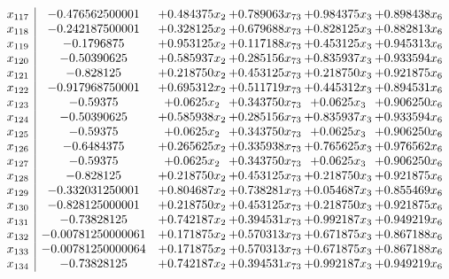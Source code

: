 \documentclass[11pt]{article}
\begin{document}
\[\begin{array}{c| c c@{\hskip 2pt} c@{\hskip 2pt} c@{\hskip 2pt} c@{\hskip 2pt} }
 x_{117}   &  -0.476562500001 & + 0.484375 x_{2} & + 0.789063 x_{73} & + 0.984375 x_{3} & + 0.898438 x_{6}\\
 x_{118}   &  -0.242187500001 & + 0.328125 x_{2} & + 0.679688 x_{73} & + 0.828125 x_{3} & + 0.882813 x_{6}\\
 x_{119}   &  -0.1796875 & + 0.953125 x_{2} & + 0.117188 x_{73} & + 0.453125 x_{3} & + 0.945313 x_{6}\\
 x_{120}   &  -0.50390625 & + 0.585937 x_{2} & + 0.285156 x_{73} & + 0.835937 x_{3} & + 0.933594 x_{6}\\
 x_{121}   &  -0.828125 & + 0.218750 x_{2} & + 0.453125 x_{73} & + 0.218750 x_{3} & + 0.921875 x_{6}\\
 x_{122}   &  -0.917968750001 & + 0.695312 x_{2} & + 0.511719 x_{73} & + 0.445312 x_{3} & + 0.894531 x_{6}\\
 x_{123}   &  -0.59375 & + 0.0625 x_{2} & + 0.343750 x_{73} & + 0.0625 x_{3} & + 0.906250 x_{6}\\
 x_{124}   &  -0.50390625 & + 0.585938 x_{2} & + 0.285156 x_{73} & + 0.835937 x_{3} & + 0.933594 x_{6}\\
 x_{125}   &  -0.59375 & + 0.0625 x_{2} & + 0.343750 x_{73} & + 0.0625 x_{3} & + 0.906250 x_{6}\\
 x_{126}   &  -0.6484375 & + 0.265625 x_{2} & + 0.335938 x_{73} & + 0.765625 x_{3} & + 0.976562 x_{6}\\
 x_{127}   &  -0.59375 & + 0.0625 x_{2} & + 0.343750 x_{73} & + 0.0625 x_{3} & + 0.906250 x_{6}\\
 x_{128}   &  -0.828125 & + 0.218750 x_{2} & + 0.453125 x_{73} & + 0.218750 x_{3} & + 0.921875 x_{6}\\
 x_{129}   &  -0.332031250001 & + 0.804687 x_{2} & + 0.738281 x_{73} & + 0.054687 x_{3} & + 0.855469 x_{6}\\
 x_{130}   &  -0.828125000001 & + 0.218750 x_{2} & + 0.453125 x_{73} & + 0.218750 x_{3} & + 0.921875 x_{6}\\
 x_{131}   &  -0.73828125 & + 0.742187 x_{2} & + 0.394531 x_{73} & + 0.992187 x_{3} & + 0.949219 x_{6}\\
 x_{132}   &  -0.00781250000061 & + 0.171875 x_{2} & + 0.570313 x_{73} & + 0.671875 x_{3} & + 0.867188 x_{6}\\
 x_{133}   &  -0.00781250000064 & + 0.171875 x_{2} & + 0.570313 x_{73} & + 0.671875 x_{3} & + 0.867188 x_{6}\\
 x_{134}   &  -0.73828125 & + 0.742187 x_{2} & + 0.394531 x_{73} & + 0.992187 x_{3} & + 0.949219 x_{6}\\

\end{array}\]
\end{document}
